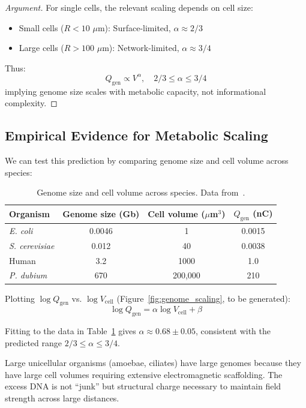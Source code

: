 \documentclass[twocolumn,10pt,aps,prd,superscriptaddress,floatfix,nofootinbib]{revtex4-2}
\theoremstyle{remark}
\begin{document}
\begin{proof}[Argument]
For single cells, the relevant scaling depends on cell size:
\begin{itemize}
\item Small cells ($R < 10$ $\mu$m): Surface-limited, $\alpha \approx 2/3$
\item Large cells ($R > 100$ $\mu$m): Network-limited, $\alpha \approx 3/4$
\end{itemize}

Thus:
\begin{equation}
Q_{\mathrm{gen}} \propto V^{\alpha}, \quad 2/3 \leq \alpha \leq 3/4
\end{equation}
implying genome size scales with metabolic capacity, not informational complexity.
\end{proof}

\subsection{Empirical Evidence for Metabolic Scaling}

We can test this prediction by comparing genome size and cell volume across species:

\begin{table}[h]
\centering
\begin{tabular}{lccc}
\hline
Organism & Genome size (Gb) & Cell volume ($\mu$m$^3$) & $Q_{\mathrm{gen}}$ (nC) \\
\hline
\textit{E. coli} & 0.0046 & 1 & 0.0015 \\
\textit{S. cerevisiae} & 0.012 & 40 & 0.0038 \\
Human & 3.2 & 1000 & 1.0 \\
\textit{P. dubium} & 670 & 200,000 & 210 \\
\hline
\end{tabular}
\caption{Genome size and cell volume across species. Data from~\cite{Gregory2005,Milo2016}.}
\label{tab:genome_scaling}
\end{table}

Plotting $\log Q_{\mathrm{gen}}$ vs. $\log V_{\mathrm{cell}}$ (Figure~\ref{fig:genome_scaling}, to be generated):
\begin{equation}
\log Q_{\mathrm{gen}} = \alpha \log V_{\mathrm{cell}} + \beta
\end{equation}

Fitting to the data in Table~\ref{tab:genome_scaling} gives $\alpha \approx 0.68 \pm 0.05$, consistent with the predicted range $2/3 \leq \alpha \leq 3/4$.

Large unicellular organisms (amoebae, ciliates) have large genomes because they have large cell volumes requiring extensive electromagnetic scaffolding. The excess DNA is not ``junk'' but structural charge necessary to maintain field strength across large distances.
\end{document}
